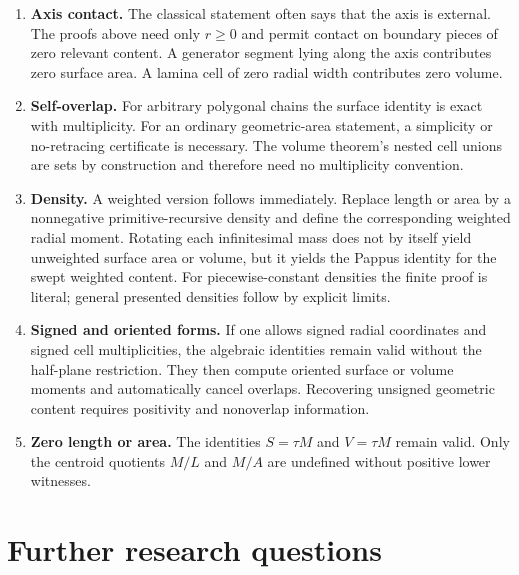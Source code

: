 \documentclass[11pt]{article}
\theoremstyle{definition}
\begin{document}
\begin{enumerate}[leftmargin=2.2em]
\item \textbf{Axis contact.}  The classical statement often says that the
axis is external.  The proofs above need only $r\geq0$ and permit contact on
boundary pieces of zero relevant content.  A generator segment lying along
the axis contributes zero surface area.  A lamina cell of zero radial width
contributes zero volume.

\item \textbf{Self-overlap.}  For arbitrary polygonal chains the surface
identity is exact with multiplicity.  For an ordinary geometric-area statement,
a simplicity or no-retracing certificate is necessary.  The volume theorem's
nested cell unions are sets by construction and therefore need no multiplicity
convention.

\item \textbf{Density.}  A weighted version follows immediately.  Replace
length or area by a nonnegative primitive-recursive density and define the
corresponding weighted radial moment.  Rotating each infinitesimal mass does
not by itself yield unweighted surface area or volume, but it yields the
Pappus identity for the swept weighted content.  For piecewise-constant
densities the finite proof is literal; general presented densities follow by
explicit limits.

\item \textbf{Signed and oriented forms.}  If one allows signed radial
coordinates and signed cell multiplicities, the algebraic identities remain
valid without the half-plane restriction.  They then compute oriented surface
or volume moments and automatically cancel overlaps.  Recovering unsigned
geometric content requires positivity and nonoverlap information.

\item \textbf{Zero length or area.}  The identities $S=\tau M$ and
$V=\tau M$ remain valid.  Only the centroid quotients $M/L$ and $M/A$ are
undefined without positive lower witnesses.
\end{enumerate}

\section{Further research questions}
\label{sec:further}
\end{document}
